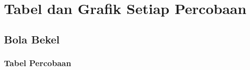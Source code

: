 \section{Tabel dan Grafik Setiap Percobaan}
\subsection{Bola Bekel}
\subsubsection{Tabel Percobaan}






















